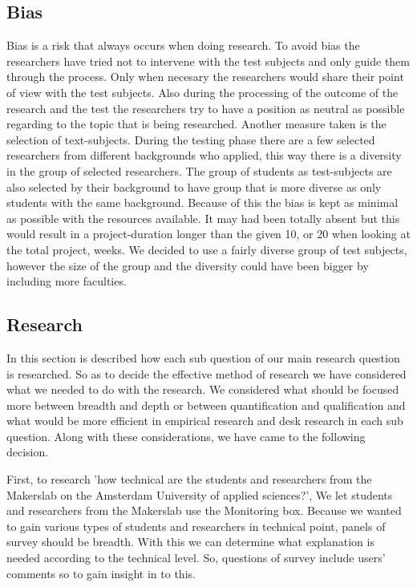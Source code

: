 \documentclass[conference]{IEEEtran}
\begin{document}
		\subsection{Bias}
			Bias is a risk that always occurs when doing research. To avoid bias the researchers have tried not to intervene with the test subjects and only guide them through the process. Only when necesary the researchers would share their point of view with the test subjects. Also during the processing of the outcome of the research and the test the researchers try to have a position as neutral as possible regarding to the topic that is being researched. Another measure taken is the selection of text-subjects. During the testing phase there are a few selected researchers from different backgrounds who applied, this way there is a diversity in the group of selected researchers. The group of students as test-subjects are also selected by their background to have group that is more diverse as only students with the same background. Because of this the bias is kept as minimal as possible with the resources available. It may had been totally absent but this would result in a project-duration longer than the given 10, or 20 when looking at the total project, weeks. We decided to use a fairly diverse group of test subjects, however the size of the group and the diversity could have been bigger by including more faculties.
		\subsection{Research}
			In this section is described how each sub question of our main research question is researched. So as to decide the effective method of research we have considered what we needed to do with the research. We considered what should be focused more between breadth and depth or between quantification and qualification and what would be more efficient in empirical research and desk research in each sub question. Along with these considerations, we have came to the following decision. 

			First, to research 'how technical are the students and researchers from the Makerslab on the Amsterdam University of applied sciences?', We let students and researchers from the Makerslab use the Monitoring box. Because we wanted to gain various types of students and researchers in technical point, panels of survey should be breadth. With this we can determine what explanation is needed according to the technical level. So, questions of survey include users' comments so to gain insight in to this. 
\end{document}
